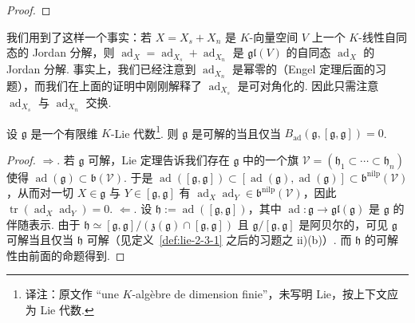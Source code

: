 \begin{numpara}
\begin{proof}
\end{proof}
\begin{remark*}
我们用到了这样一个事实：若 $X=X_{s}+X_{n}$ 是 $K$-向量空间 $V$ 上一个 $K$-线性自同态的 Jordan 分解，则 $\operatorname{ad}_{X}=\operatorname{ad}_{X_{s}}+\operatorname{ad}_{X_{n}}$ 是 $\mathfrak{gl}(V)$ 的自同态 $\operatorname{ad}_{X}$ 的 Jordan 分解. 事实上，我们已经注意到 $\operatorname{ad}_{X_{n}}$ 是幂零的（Engel 定理后面的习题），而我们在上面的证明中刚刚解释了 $\operatorname{ad}_{X_{s}}$ 是可对角化的. 因此只需注意 $\operatorname{ad}_{X_{s}}$ 与 $\operatorname{ad}_{X_{n}}$ 交换.
\end{remark*}
\begin{corollary*}[Cartan 判据]
设 $\mathfrak g$ 是一个有限维 $K$-Lie 代数\footnote{译注：原文作 ``une $K$-algèbre de dimension finie''，未写明 Lie，按上下文应为 Lie 代数.}. 则 $\mathfrak g$ 是可解的当且仅当 $B_{\operatorname{ad}}(\mathfrak g,[\mathfrak g,\mathfrak g])=0$.
\end{corollary*}
\begin{proof}
$\Rightarrow$. 若 $\mathfrak g$ 可解，Lie 定理告诉我们存在 $\mathfrak g$ 中的一个旗 $\mathcal V=(\mathfrak h_{1}\subset\cdots\subset\mathfrak h_{n})$ 使得 $\operatorname{ad}(\mathfrak g)\subset\mathfrak b(\mathcal V)$. 于是 $\operatorname{ad}([\mathfrak g,\mathfrak g])\subset[\operatorname{ad}(\mathfrak g),\operatorname{ad}(\mathfrak g)]\subset\mathfrak b^{\mathrm{nilp}}(\mathcal V)$，从而对一切 $X\in\mathfrak g$ 与 $Y\in[\mathfrak g,\mathfrak g]$ 有 $\operatorname{ad}_{X}\operatorname{ad}_{Y}\in\mathfrak b^{\mathrm{nilp}}(\mathcal V)$，因此 $\operatorname{tr}(\operatorname{ad}_{X}\operatorname{ad}_{Y})=0$.
$\Leftarrow$. 设 $\mathfrak h:=\operatorname{ad}([\mathfrak g,\mathfrak g])$，其中 $\operatorname{ad}:\mathfrak g\longrightarrow\mathfrak{gl}(\mathfrak g)$ 是 $\mathfrak g$ 的伴随表示. 由于 $\mathfrak h\simeq[\mathfrak g,\mathfrak g]/(\mathfrak z(\mathfrak g)\cap[\mathfrak g,\mathfrak g])$ 且 $\mathfrak g/[\mathfrak g,\mathfrak g]$ 是阿贝尔的，可见 $\mathfrak g$ 可解当且仅当 $\mathfrak h$ 可解（见定义~\ref{def:lie-2-3-1} 之后的习题之 ii)(b)）. 而 $\mathfrak h$ 的可解性由前面的命题得到.
\end{proof}
\end{numpara}
